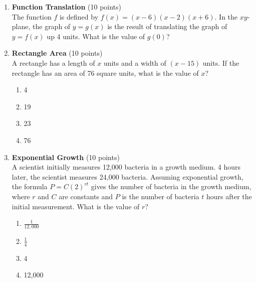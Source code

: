 \begin{enumerate}
  \item \textbf{Function Translation} (10 points)\\
  The function $f$ is defined by $f(x)=(x-6)(x-2)(x+6)$. In the $xy$-plane, the graph of $y=g(x)$ is the result of translating the graph of $y=f(x)$ up 4 units. What is the value of $g(0)$?
  \begin{subanswer}
  \end{subanswer}

  \item \textbf{Rectangle Area} (10 points)\\
  A rectangle has a length of $x$ units and a width of $(x-15)$ units. If the rectangle has an area of 76 square units, what is the value of $x$?
  \begin{enumerate}[label=(\Alph*)]
    \item 4
    \item 19
    \item 23
    \item 76
  \end{enumerate}
  \begin{subanswer}
  \end{subanswer}

  \item \textbf{Exponential Growth} (10 points)\\
  A scientist initially measures 12,000 bacteria in a growth medium. 4 hours later, the scientist measures 24,000 bacteria. Assuming exponential growth, the formula $P=C(2)^{rt}$ gives the number of bacteria in the growth medium, where $r$ and $C$ are constants and $P$ is the number of bacteria $t$ hours after the initial measurement. What is the value of $r$?
  \begin{enumerate}[label=(\Alph*)]
    \item $\frac{1}{12,000}$
    \item $\frac{1}{4}$
    \item 4
    \item 12,000
  \end{enumerate}
  \begin{subanswer}
  \end{subanswer}


\end{enumerate}
